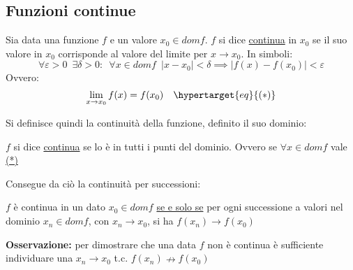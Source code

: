 \documentclass[10pt]{article}
\theoremstyle{plain}
\begin{document}
\subsection{Funzioni continue}
\begin{defin}
Sia data una funzione $f$ e un valore $x_0 \in dom f$. $f$ si dice \underline{continua} in $x_0$ se il suo valore in $x_0$ corrisponde al valore del limite per $x \rightarrow x_0$. In simboli:
\[\forall \varepsilon >0 \enspace \exists \delta > 0 : \enspace \forall x \in domf \enspace |x-x_0| < \delta \implies |f(x)-f(x_0)| < \varepsilon\]
Ovvero:
\[\lim \limits_{x \rightarrow x_0} f(x) = f(x_0) \quad {\hypertarget{eq}{(*)}}\]
\end{defin}
Si definisce quindi la continuità della funzione, definito il suo dominio:
\begin{defin}
$f$ si dice \underline{continua} se lo è in tutti i punti del dominio. Ovvero se $\forall x \in domf$ vale \hyperlink{eq}{(*)}
\end{defin}
Consegue da ciò la continuità per successioni:
\begin{ther}
$f$ è continua in un dato $x_0 \in domf$ \underline{se e solo se} per ogni successione a valori nel dominio $x_n \in domf$, con $x_n \longrightarrow x_0$, si ha $f(x_n) \longrightarrow f(x_0)$
\end{ther}
\begin{center}
\end{center}
\textbf{Osservazione: } per dimostrare che una data $f$ non è continua è sufficiente individuare una $x_n \longrightarrow x_0$ t.c. $f(x_n) \nrightarrow f(x_0)$
\end{document}
